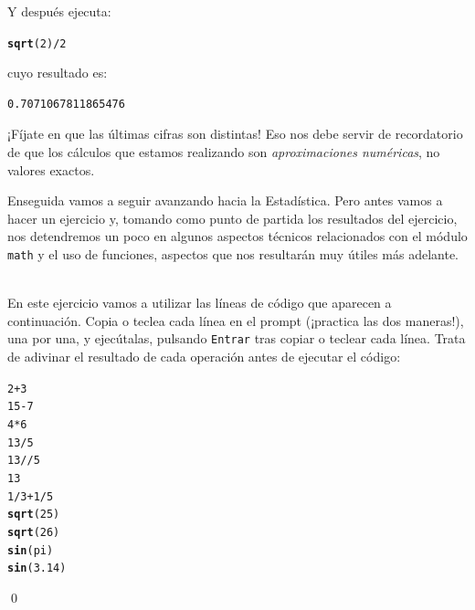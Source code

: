 \documentclass[10pt,a4paper]{article}\usepackage[]{graphicx}\usepackage[]{color}
\makeatletter
\newcommand{\hlnum}[1]{\textcolor[rgb]{0.686,0.059,0.569}{#1}}%
\newcommand{\hlopt}[1]{\textcolor[rgb]{0,0,0}{#1}}%
\newcommand{\hlstd}[1]{\textcolor[rgb]{0.345,0.345,0.345}{#1}}%
\newcommand{\hlkwd}[1]{\textcolor[rgb]{0.737,0.353,0.396}{\textbf{#1}}}%
\newenvironment{kframe}{%
 \def\at@end@of@kframe{}%
 \ifinner\ifhmode%
  \def\at@end@of@kframe{\end{minipage}}%
  \begin{minipage}{\columnwidth}%
 \fi\fi%
 \def\FrameCommand##1{\hskip\@totalleftmargin \hskip-\fboxsep
 \colorbox{shadecolor}{##1}\hskip-\fboxsep
     \hskip-\linewidth \hskip-\@totalleftmargin \hskip\columnwidth}%
 \MakeFramed {\advance\hsize-\width
   \@totalleftmargin\z@ \linewidth\hsize
   \@setminipage}}%
 {\par\unskip\endMakeFramed%
 \at@end@of@kframe}
\newenvironment{knitrout}{}{} %
\newcounter {cont01}
\makeatother
\begin{document}
Y después ejecuta:
\begin{knitrout}
\color{fgcolor}\begin{kframe}
\begin{alltt}
\hlkwd{sqrt}\hlstd{(}\hlnum{2}\hlstd{)}\hlopt{/}\hlnum{2}
\end{alltt}
\end{kframe}
\end{knitrout}
cuyo resultado es:
\begin{knitrout}
\color{fgcolor}\begin{kframe}
\begin{verbatim}
0.7071067811865476
\end{verbatim}
\end{kframe}
\end{knitrout}
¡Fíjate en que las últimas cifras son distintas! Eso nos debe servir de recordatorio de que los cálculos que estamos realizando son {\em aproximaciones numéricas}, no valores exactos.

Enseguida vamos a seguir avanzando hacia la Estadística. Pero antes vamos a hacer un ejercicio y, tomando como punto de partida los resultados del ejercicio, nos detendremos un poco en algunos aspectos técnicos relacionados con el módulo {\tt math} y el uso de funciones, aspectos que nos resultarán muy útiles más adelante.

\begin{ejercicio}
\label{tut02:ejercicio01}
\quad\\
En este ejercicio vamos a utilizar las líneas de  código que aparecen a continuación. Copia o teclea cada línea en el prompt (¡practica las dos maneras!), una por una, y ejecútalas, pulsando {\tt Entrar} tras copiar o teclear cada línea. Trata de adivinar el resultado de cada operación antes de ejecutar el código:
\begin{knitrout}
\color{fgcolor}\begin{kframe}
\begin{alltt}
2 + 3
15 - 7
4 * 6
13 / 5
13 // 5
13 %
1 / 3 + 1 / 5
\hlkwd{sqrt}(25)
\hlkwd{sqrt}(26)
\hlkwd{sin}(pi)
\hlkwd{sin}(3.14)
\end{alltt}
\end{kframe}
\end{knitrout}
\qed
\end{ejercicio}
\end{document}
